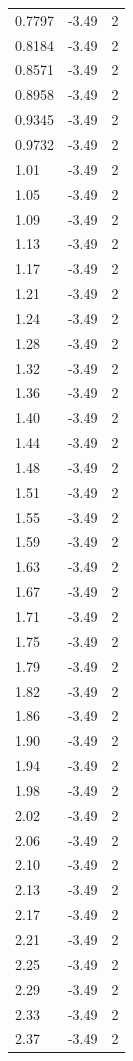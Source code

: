 \begin{longtable}{lrr}
  0.7797 & -3.49 & 2 \\
  0.8184 & -3.49 & 2 \\
  0.8571 & -3.49 & 2 \\
  0.8958 & -3.49 & 2 \\
  0.9345 & -3.49 & 2 \\
  0.9732 & -3.49 & 2 \\
  1.01 & -3.49 & 2 \\
  1.05 & -3.49 & 2 \\
  1.09 & -3.49 & 2 \\
  1.13 & -3.49 & 2 \\
  1.17 & -3.49 & 2 \\
  1.21 & -3.49 & 2 \\
  1.24 & -3.49 & 2 \\
  1.28 & -3.49 & 2 \\
  1.32 & -3.49 & 2 \\
  1.36 & -3.49 & 2 \\
  1.40 & -3.49 & 2 \\
  1.44 & -3.49 & 2 \\
  1.48 & -3.49 & 2 \\
  1.51 & -3.49 & 2 \\
  1.55 & -3.49 & 2 \\
  1.59 & -3.49 & 2 \\
  1.63 & -3.49 & 2 \\
  1.67 & -3.49 & 2 \\
  1.71 & -3.49 & 2 \\
  1.75 & -3.49 & 2 \\
  1.79 & -3.49 & 2 \\
  1.82 & -3.49 & 2 \\
  1.86 & -3.49 & 2 \\
  1.90 & -3.49 & 2 \\
  1.94 & -3.49 & 2 \\
  1.98 & -3.49 & 2 \\
  2.02 & -3.49 & 2 \\
  2.06 & -3.49 & 2 \\
  2.10 & -3.49 & 2 \\
  2.13 & -3.49 & 2 \\
  2.17 & -3.49 & 2 \\
  2.21 & -3.49 & 2 \\
  2.25 & -3.49 & 2 \\
  2.29 & -3.49 & 2 \\
  2.33 & -3.49 & 2 \\
  2.37 & -3.49 & 2 \\

\end{longtable}

